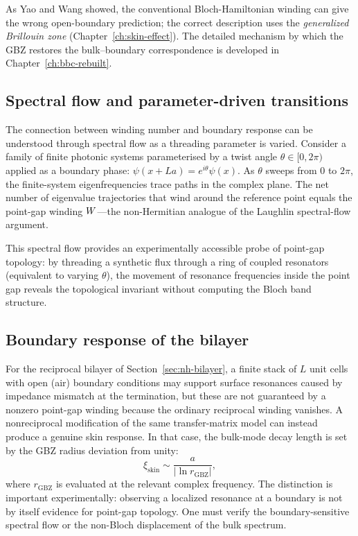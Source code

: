 As Yao and Wang showed, the conventional Bloch-Hamiltonian winding can
give the wrong open-boundary prediction; the correct description uses
the \emph{generalized Brillouin zone} (Chapter~\ref{ch:skin-effect}).
The detailed mechanism by which the GBZ restores the bulk--boundary
correspondence is developed in Chapter~\ref{ch:bbc-rebuilt}.

\subsection{Spectral flow and parameter-driven transitions}
\label{ssec:spectral-flow}

The connection between winding number and boundary response can be
understood through spectral flow as a threading parameter is varied.
Consider a family of finite photonic systems parameterised by a twist angle
$\theta \in [0, 2\pi)$ applied as a boundary phase:
$\psi(x + La) = e^{i\theta}\psi(x)$. As $\theta$ sweeps from $0$
to $2\pi$, the finite-system eigenfrequencies trace paths in the
complex plane. The net number of eigenvalue trajectories that wind
around the reference point equals the point-gap winding $W$---the
non-Hermitian analogue of the Laughlin spectral-flow argument.

This spectral flow provides an experimentally accessible probe of
point-gap topology: by threading a synthetic flux through a ring of
coupled resonators (equivalent to varying $\theta$), the movement of
resonance frequencies inside the point gap reveals the topological
invariant without computing the Bloch band structure.

\subsection{Boundary response of the bilayer}
\label{ssec:edge-bilayer}

For the reciprocal bilayer of Section~\ref{sec:nh-bilayer}, a finite
stack of $L$ unit cells with open (air) boundary conditions may support
surface resonances caused by impedance mismatch at the termination, but
these are not guaranteed by a nonzero point-gap winding because the
ordinary reciprocal winding vanishes. A nonreciprocal modification of
the same transfer-matrix model can instead produce a genuine skin
response. In that case, the bulk-mode decay length is set by the GBZ
radius deviation from unity:
\begin{equation}
 \xi_{\mathrm{skin}} \sim \frac{a}{|\ln r_{\mathrm{GBZ}}|},
 \label{eq:edge-localization}
\end{equation}
where $r_{\mathrm{GBZ}}$ is evaluated at the relevant complex
frequency. The distinction is important experimentally: observing a
localized resonance at a boundary is not by itself evidence for
point-gap topology. One must verify the boundary-sensitive spectral flow
or the non-Bloch displacement of the bulk spectrum.


